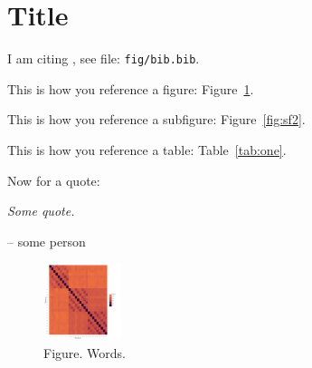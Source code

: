 \documentclass{article}
\begin{document}


\section*{Title}

\tableofcontents

\clearpage


I am citing \cite{author1999}, see file: \texttt{fig/bib.bib}.

\bigskip

This is how you reference a figure: Figure~\ref{fig:one}.

\bigskip

This is how you reference a subfigure: Figure~\ref{fig:sf2}.

\bigskip

This is how you reference a table: Table~\ref{tab:one}.

\bigskip



Now for a quote:
\begin{displayquote}
\textsl{Some quote.}
\end{displayquote}
-- some person


\begin{figure}[h!]
 \centering
   \includegraphics[width=0.2\textwidth]{fig/corr.pdf}
 \caption{Figure. Words.} \label{fig:one}
\end{figure}



\end{document}
